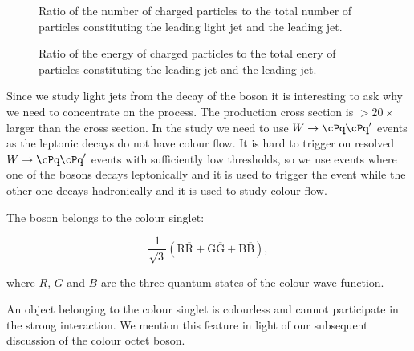 \begin{figure}[hbtp]
\centering
\def\twidth{0.45}
\caption{Ratio of the number of charged particles to the total number of particles constituting the leading light jet and the leading \cPqb jet.}
\label{fig:charged_contentN}
\end{figure}

\begin{figure}[hbtp]
\centering
\def\twidth{0.45}
\caption{Ratio of the energy of charged particles to the total enery of particles constituting the leading jet and the leading \cPqb jet.}
\label{fig:charged_contentE}
\end{figure}

Since we study light jets from the decay of the \PW boson it is interesting to ask why we need to concentrate on the \ttbar process. The \PW production cross section is $>20\times$ larger than the \ttbar cross section. In the study we need to use  $\PW\rightarrow \cPq\cPq'$ events as the leptonic decays do not have colour flow. It is hard to trigger on resolved $\PW\rightarrow \cPq\cPq'$ events with sufficiently low \pt thresholds, so we use \ttbar events where one of the \PW bosons decays leptonically and it is used to trigger the event while the other one decays hadronically and it is used to study colour flow.

The \PW boson belongs to the colour singlet:

\begin{equation}
\frac{1}{\sqrt{3}}\left(\text{R}\overline{\text{R}}+\text{G}\overline{\text{G}}+\text{B}\overline{\text{B}}\right),
\end{equation}

where $R$, $G$ and $B$ are the three quantum states of the colour wave function.

An object belonging to the colour singlet is colourless and cannot participate in the strong interaction. We mention this feature in light of our subsequent discussion of the colour octet \PW boson.

